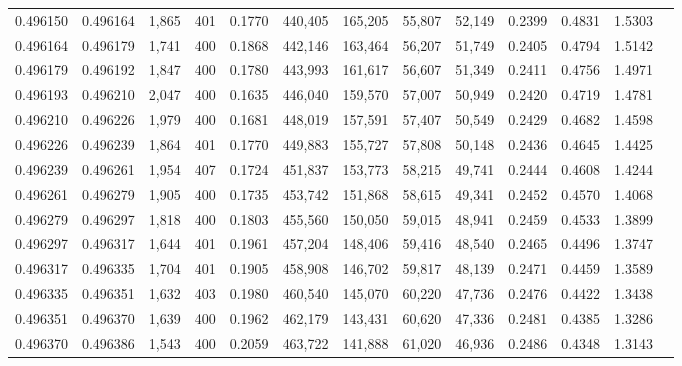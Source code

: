 \begin{tabular}{rrrrrrrrrrrrr}
0.496150 & 0.496164 & 1,865 & 401 &                                     0.1770 & 440,405 & 165,205 &  55,807 &  52,149 & 0.2399 & 0.4831 & 1.5303 \\
0.496164 & 0.496179 & 1,741 & 400 &                                     0.1868 & 442,146 & 163,464 &  56,207 &  51,749 & 0.2405 & 0.4794 & 1.5142 \\
0.496179 & 0.496192 & 1,847 & 400 &                                     0.1780 & 443,993 & 161,617 &  56,607 &  51,349 & 0.2411 & 0.4756 & 1.4971 \\
0.496193 & 0.496210 & 2,047 & 400 &                                     0.1635 & 446,040 & 159,570 &  57,007 &  50,949 & 0.2420 & 0.4719 & 1.4781 \\
0.496210 & 0.496226 & 1,979 & 400 &                                     0.1681 & 448,019 & 157,591 &  57,407 &  50,549 & 0.2429 & 0.4682 & 1.4598 \\
0.496226 & 0.496239 & 1,864 & 401 &                                     0.1770 & 449,883 & 155,727 &  57,808 &  50,148 & 0.2436 & 0.4645 & 1.4425 \\
0.496239 & 0.496261 & 1,954 & 407 &                                     0.1724 & 451,837 & 153,773 &  58,215 &  49,741 & 0.2444 & 0.4608 & 1.4244 \\
0.496261 & 0.496279 & 1,905 & 400 &                                     0.1735 & 453,742 & 151,868 &  58,615 &  49,341 & 0.2452 & 0.4570 & 1.4068 \\
0.496279 & 0.496297 & 1,818 & 400 &                                     0.1803 & 455,560 & 150,050 &  59,015 &  48,941 & 0.2459 & 0.4533 & 1.3899 \\
0.496297 & 0.496317 & 1,644 & 401 &                                     0.1961 & 457,204 & 148,406 &  59,416 &  48,540 & 0.2465 & 0.4496 & 1.3747 \\
0.496317 & 0.496335 & 1,704 & 401 &                                     0.1905 & 458,908 & 146,702 &  59,817 &  48,139 & 0.2471 & 0.4459 & 1.3589 \\
0.496335 & 0.496351 & 1,632 & 403 &                                     0.1980 & 460,540 & 145,070 &  60,220 &  47,736 & 0.2476 & 0.4422 & 1.3438 \\
0.496351 & 0.496370 & 1,639 & 400 &                                     0.1962 & 462,179 & 143,431 &  60,620 &  47,336 & 0.2481 & 0.4385 & 1.3286 \\
0.496370 & 0.496386 & 1,543 & 400 &                                     0.2059 & 463,722 & 141,888 &  61,020 &  46,936 & 0.2486 & 0.4348 & 1.3143 \\

\end{tabular}
